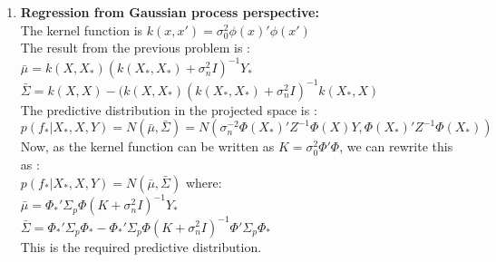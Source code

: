\begin{enumerate}
{\begin{enumerate}
{		$p(f_{*} | X_{*},X,Y) \sim N(\bar{\mu}, \bar{\Sigma})$, where :\\
		
		$\bar{\Sigma	} = X_{*}'Z^{-1}X_{*}$\\	

		$\bar{\mu} = \sigma_{n}^{-2} X_{*}'Z^{-1}XY_{*}$\\	
		
		$ Z  = 	(\sigma_{n}^{-2}XX' + \Sigma_{p}^{-1})$
		
		This the required mean and covariance of this distribution. We note the symmetry between the predictive and  posterior distribution.
	}		

	\item{
		\textbf{Regression from Gaussian process perspective:}\\
		
		The kernel function is $k(x,x') = \sigma_{0}^{2} \phi(x)'\phi(x')$\\

		The result from the previous problem is :\\
		
		$\bar{\mu} = k(X,X_{*})(k(X_{*},X_{*}) + \sigma_{n}^{2}I)^{-1}Y_{*}$\\
		
		$\bar{\Sigma} = k(X,X) - (k(X,X_{*})(k(X_{*},X_{*}) + \sigma_{n}^{2}I)^{-1}k(X_{*},X)$\\
			
		The predictive distribution in the projected space is :\\
		
		$p (f_{*} | X_{*},X,Y) = N(\bar{\mu}, \bar{\Sigma}) = N( \sigma_{n}^{-2} \Phi(X_{*})' Z^{-1} \Phi(X)Y, \Phi(X_{*})'Z^{-1}\Phi(X_{*}) )$\\
		
		Now, as the kernel function can be written as $K = \sigma_{0}^{2}\Phi'\Phi$, we can rewrite this as :\\
		
		$p (f_{*} | X_{*},X,Y) = N(\bar{\mu}, \bar{\Sigma})$ where:\\
		
		$\bar{\mu} =  \Phi_{*}'\Sigma_{p}\Phi(K+\sigma_{n}^{2}I)^{-1}Y_{*} $\\
		
		$\bar{\Sigma} =  \Phi_{*}'\Sigma_{p}\Phi_{*} - \Phi_{*}'\Sigma_{p}\Phi(K+\sigma_{n}^{2}I)^{-1}\Phi'\Sigma_{p}\Phi_{*}$\\
		
		This is the required predictive distribution.			
	}	
	

\end{enumerate}}
\end{enumerate}
